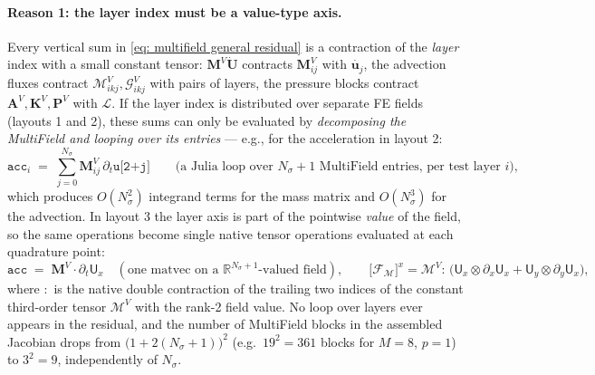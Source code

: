 \documentclass{article}
\newcommand{\Ns}{N_\sigma}
\newcommand{\uj}{\mathbf{u}_j}
\newcommand{\VMij}{\mathbf{M}_{ij}^V}
\newcommand{\VMikj}{\boldsymbol{\mathcal{M}}_{ikj}^V}
\newcommand{\VGikj}{\boldsymbol{\mathcal{G}}_{ikj}^V}
\newcommand{\VmM}{\mathbf{M}^V}
\newcommand{\VmA}{\mathbf{A}^V}
\newcommand{\VmK}{\mathbf{K}^V}
\newcommand{\VtM}{\boldsymbol{\mathcal{M}}^V}
\newcommand{\VmP}{\mathbf{P}^V}
\newcommand{\VL}{\boldsymbol{\mathcal{L}}}
\begin{document}
\paragraph{Reason 1: the layer index must be a value-type axis.}
Every vertical sum in \eqref{eq: multifield general residual} is a contraction of the \emph{layer} index with a small constant tensor: $\VmM\dot{\mathbf{U}}$ contracts $\VMij$ with $\dot{\uj}$, the advection fluxes contract $\VMikj,\VGikj$ with pairs of layers, the pressure blocks contract $\VmA,\VmK,\VmP$ with $\VL$. If the layer index is distributed over separate FE fields (layouts 1 and 2), these sums can only be evaluated by \emph{decomposing the MultiField and looping over its entries} — e.g., for the acceleration in layout 2:
$$\texttt{acc}_i \;=\; \sum_{j=0}^{\Ns} \VMij\, \partial_t \texttt{u[2+j]} \qquad \text{(a Julia loop over $\Ns+1$ MultiField entries, per test layer $i$)},$$
which produces $O(\Ns^2)$ integrand terms for the mass matrix and $O(\Ns^3)$ for the advection. In layout 3 the layer axis is part of the pointwise \emph{value} of the field, so the same operations become single native tensor operations evaluated at each quadrature point:
$$\texttt{acc} \;=\; \VmM \cdot \partial_t\mathsf{U}_x \quad (\text{one matvec on a } \mathbb{R}^{\Ns+1}\text{-valued field}), \qquad
\big[\boldsymbol{\mathcal{F}}_{\mathcal{M}}\big]^x = \VtM \boldsymbol{:}\, \big(\mathsf{U}_x \otimes \partial_x\mathsf{U}_x + \mathsf{U}_y \otimes \partial_y\mathsf{U}_x\big),$$
where $\boldsymbol{:}$ is the native double contraction of the trailing two indices of the constant third-order tensor $\VtM$ with the rank-2 field value. No loop over layers ever appears in the residual, and the number of MultiField blocks in the assembled Jacobian drops from $\big(1+2(\Ns+1)\big)^2$ (e.g.\ $19^2 = 361$ blocks for $M=8$, $p=1$) to $3^2 = 9$, independently of $\Ns$.
\end{document}
